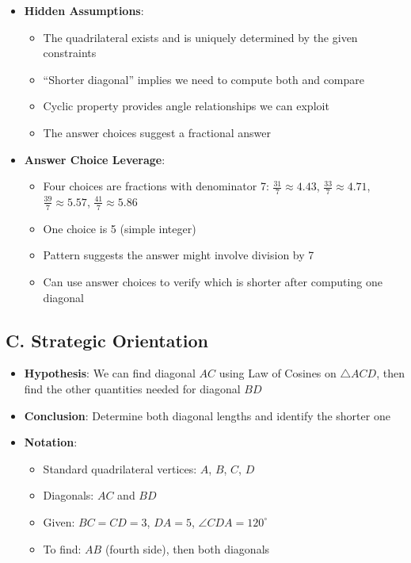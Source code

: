 \documentclass[11pt]{article}
\begin{document}
\begin{problemconfigbox}
\begin{itemize}[leftmargin=*]
    \item \textbf{Hidden Assumptions}: 
    \begin{itemize}
        \item The quadrilateral exists and is uniquely determined by the given constraints
        \item ``Shorter diagonal'' implies we need to compute both and compare
        \item Cyclic property provides angle relationships we can exploit
        \item The answer choices suggest a fractional answer
    \end{itemize}
    
    \item \textbf{Answer Choice Leverage}: 
    \begin{itemize}
        \item Four choices are fractions with denominator 7: $\frac{31}{7} \approx 4.43$, $\frac{33}{7} \approx 4.71$, $\frac{39}{7} \approx 5.57$, $\frac{41}{7} \approx 5.86$
        \item One choice is 5 (simple integer)
        \item Pattern suggests the answer might involve division by 7
        \item Can use answer choices to verify which is shorter after computing one diagonal
    \end{itemize}
\end{itemize}

\subsection*{C. Strategic Orientation}
\begin{itemize}[leftmargin=*]
    \item \textbf{Hypothesis}: We can find diagonal $AC$ using Law of Cosines on $\triangle ACD$, then find the other quantities needed for diagonal $BD$
    
    \item \textbf{Conclusion}: Determine both diagonal lengths and identify the shorter one
    
    \item \textbf{Notation}: 
    \begin{itemize}
        \item Standard quadrilateral vertices: $A$, $B$, $C$, $D$
        \item Diagonals: $AC$ and $BD$
        \item Given: $BC = CD = 3$, $DA = 5$, $\angle CDA = 120^\circ$
        \item To find: $AB$ (fourth side), then both diagonals
    \end{itemize}
    

\end{itemize}
\end{problemconfigbox}
\end{document}
